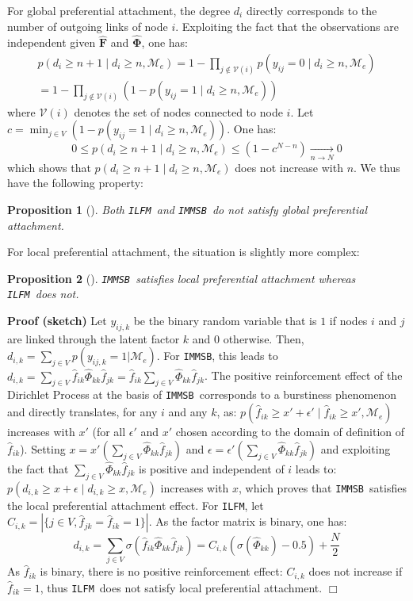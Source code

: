 \documentclass[9pt,twocolumn,twoside]{pnas-new}
\newcommand{\ifm}{\texttt{ILFM}}
\newcommand{\imb}{\texttt{IMMSB}}
\newcommand{\pr}{p}
\newcommand{\mat}[1]{\mathbf{#1}}
\newtheorem{proposition}{Proposition}[section]
\begin{document}
For global preferential attachment, the degree $d_i$ directly corresponds to the number of outgoing links of node $i$. Exploiting the fact that the observations are independent given $\mat{\hat{F}}$ and $\mat{\hat{\Phi}}$, one has:
%
\begin{align}
\pr(d_{i} \ge n+1 \mid d_{i} \ge n, \mathcal{M}_e) = 1 - \prod_{j \notin \mathcal{V}(i)} p(y_{ij} = 0 \mid d_{i} \ge n, \mathcal{M}_e) \nonumber \\
= 1 - \prod_{j \notin \mathcal{V}(i)} (1 - p(y_{ij} = 1 \mid d_{i} \ge n, \mathcal{M}_e)) \nonumber
\end{align}
%
where $\mathcal{V}(i)$ denotes the set of nodes connected to node $i$. Let $c=\min_{j \in V}  (1-p(y_{ij} = 1 \mid d_{i} \ge n, \mathcal{M}_e))$. One has:
%
\[
0 \le \pr(d_{i} \ge n+1 \mid d_{i} \ge n, \mathcal{M}_e) \le (1 - c^{N-n}) \xrightarrow[n \rightarrow N]{} 0
\]
%
which shows that $\pr(d_{i} \ge n+1 \mid d_{i} \ge n, \mathcal{M}_e)$ does not increase with $n$. We thus have the following property:
%
\begin{proposition}[]
\label{pref-attch-glob}
Both \ifm\ and \imb\ do not satisfy global preferential attachment.
\end{proposition}
%
For local preferential attachment, the situation is slightly more complex:
%
\begin{proposition}[]
\label{pref-attch-loc}
\imb\ satisfies local preferential attachment whereas \ifm\ does not.
\end{proposition}
%
\noindent \textbf{Proof (sketch)} Let $y_{ij,k}$ be the binary random variable that is $1$ if nodes $i$ and $j$ are linked through the latent factor $k$ and $0$ otherwise. Then, $d_{i,k} = \sum_{j \in V} \pr(y_{ij,k} =1 | \mathcal{M}_e)$. For \imb, this leads to $d_{i,k} = \sum_{j \in V} \hat{f}_{ik} \hat{\Phi}_{kk} \hat{f}_{jk} = \hat{f}_{ik} \sum_{j \in V} \hat{\Phi}_{kk} \hat{f}_{jk}$. The positive reinforcement effect of the Dirichlet Process \cite{HDP} at the basis of \imb\ corresponds to a burstiness phenomenon and directly translates, for any $i$ and any $k$, as: $\pr(\hat{f}_{ik} \ge x'+\epsilon' \mid \hat{f}_{ik} \ge x',\mathcal{M}_e)$ increases with $x'$ (for all $\epsilon'$ and $x'$ chosen according to the domain of definition of $\hat{f}_{ik}$). Setting $x=x'(\sum_{j\in V} \hat{\Phi}_{kk} \hat{f}_{jk})$ and $\epsilon = \epsilon'(\sum_{j\in V} \hat{\Phi}_{kk} \hat{f}_{jk})$ and exploiting the fact that $\sum_{j\in V} \hat{\Phi}_{kk} \hat{f}_{jk}$ is positive and independent of $i$ leads to: $\pr(d_{i,k} \ge x+\epsilon \mid d_{i,k} \ge x, \mathcal{M}_e)$ increases with $x$, which proves that \imb\ satisfies the local preferential attachment effect. For \ifm,  let $C_{i,k} = |\{j \in V, \hat{f}_{jk} = \hat{f}_{ik} = 1\}|$. As the factor matrix is binary, one has:
%
\[ 
d_{i,k} = \sum_{j\in V} \sigma(\hat{f}_{ik} \hat{\Phi}_{kk} \hat{f}_{jk}) =  C_{i,k} (\sigma(\hat{\Phi}_{kk})-0.5) + \frac{N}{2}
\]
%
As $\hat{f}_{ik}$ is binary, there is no positive reinforcement effect: $C_{i,k}$ does not increase if $\hat{f}_{ik}=1$, thus \ifm\ does not satisfy local preferential attachment. \hspace{4.69cm} $\Box$
\end{document}
